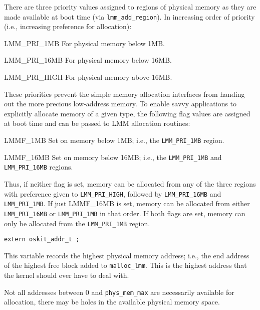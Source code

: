 \label{phys-lmm-h}
\begin{apisyn}
\end{apisyn}
\begin{apidesc}
	There are three priority values assigned to regions of
	physical memory as they are made available at boot time
	(via {\tt lmm_add_region}).
	In increasing order of priority
	(i.e., increasing preference for allocation):
	\begin{csymlist}
	\item[LMM_PRI_1MB]		
		For physical memory below 1MB.
	\item[LMM_PRI_16MB]		
		For physical memory below 16MB.
	\item[LMM_PRI_HIGH]		
		For physical memory above 16MB.
	\end{csymlist}
	These priorities prevent the simple memory allocation interfaces
	from handing out the more precious low-address memory.
	To enable savvy applications to explicitly allocate memory of a
	given type, the following flag values are assigned at boot time
	and can be passed to LMM allocation routines:
	\begin{csymlist}
	\item[LMMF_1MB]		\ttindex{LMMF_1MB}
		Set on memory below 1MB;
		i.e., the {\tt LMM_PRI_1MB} region.
	\item[LMMF_16MB]	\ttindex{LMMF_16MB}
		Set on memory below 16MB;
		i.e., the {\tt LMM_PRI_1MB} and {\tt LMM_PRI_16MB} regions.
	\end{csymlist}
	Thus, if neither flag is set, memory can be allocated from any of the
	three regions with preference given to {\tt LMM_PRI_HIGH}, followed
	by {\tt LMM_PRI_16MB} and {\tt LMM_PRI_1MB}.
	If just {LMMF_16MB} is set, memory can be allocated from either
	{\tt LMM_PRI_16MB} or {\tt LMM_PRI_1MB} in that order.
	If both flags are set, memory can only be allocated from the
	{\tt LMM_PRI_1MB} region.
\end{apidesc}

\label{phys-mem-max}
\begin{apisyn}

	{\tt extern oskit_addr_t ;}
\end{apisyn}
\begin{apidesc}
	This variable records the highest physical memory address;
	i.e., the end address of the highest free block added to
	{\tt malloc_lmm}.
	This is the highest address that the kernel should ever have to
	deal with.

	Not all addresses between 0 and {\tt phys_mem_max} are necessarily
	available for allocation, there may be holes in the available physical
	memory space.
\end{apidesc}

